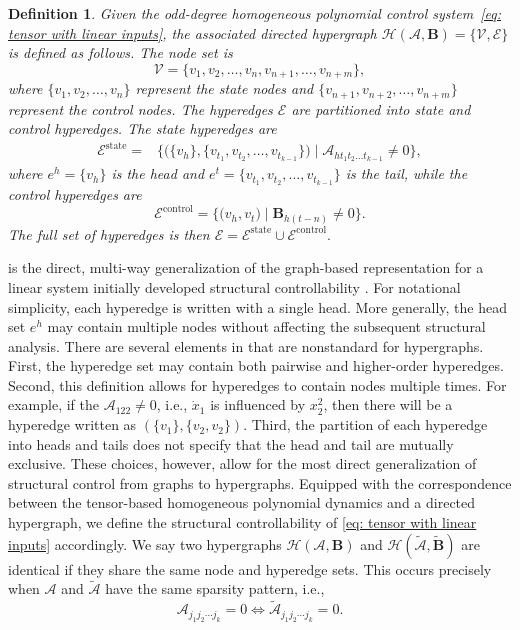 \documentclass[journal,twoside,web]{ieeecolor}
\newtheorem{definition}{Definition}
\begin{document}
\begin{definition}\label{def: HG of tA Bv}
Given the odd-degree homogeneous polynomial control system~\eqref{eq: tensor with linear inputs}, 
the associated directed hypergraph 
$\mathcal{H}(\mathscr{A},\mathbf{B}) = \{\mathcal{V}, \mathcal{E}\}$ 
is defined as follows. The node set is
\[
\mathcal{V} = \{v_1, v_2, \dots, v_n, v_{n+1}, \dots, v_{n+m}\},
\]
where $\{v_1, v_2, \dots, v_n\}$ represent the state nodes and 
$\{v_{n+1}, v_{n+2}, \dots, v_{n+m}\}$ represent the control nodes.   The hyperedges $\mathcal{E}$ are partitioned into state and control hyperedges. The state hyperedges are
    \begin{align*}       
        \mathcal{E}^\text{state}=&\Big\{\big(\{v_{h}\},\{v_{t_1}, v_{t_2},\dots,v_{t_{k-1}}\}\big)\;\big|\;\mathscr{A}_{h{t_1}{t_2}\dots {t_{k-1}}}\neq 0\Big\},
    \end{align*}
    where $e^h=\{v_{h}\}$ is the head and $e^t=\{v_{t_1},v_{t_2},\dots,v_{t_{k-1}}\}$ is the tail,
    while the control hyperedges are
    \begin{equation*}
        \mathcal{E}^{\text{control}}
        =
        \Big\{
        \big(
        v_{h},
        v_t\big)
        \;|\;
        \mathbf{B}_{h(t-n)} \neq 0
        \Big\}.
    \end{equation*}
    The full set of hyperedges is then $\mathcal{E}=\mathcal{E}^\text{state}\cup\mathcal{E}^\text{control}.$
\end{definition}


 is the direct, multi-way generalization of the graph-based representation for a linear system initially developed structural controllability \cite[Section II]{lin1974structural}. For notational simplicity, each hyperedge is written with a single head. More generally, the head set $e^h$ may contain multiple nodes without affecting the subsequent structural analysis.
%
There are several elements in  that are nonstandard for hypergraphs.
%
First, the hyperedge set may contain both pairwise and higher-order hyperedges.
%
Second, this definition allows for hyperedges to contain nodes multiple times.
%
For example, if the $\mathscr{A}_{122}\neq0$, i.e., $\dot{{x}}_1$ is influenced by ${x}_2^2$, then there will be a hyperedge written as $(\{v_1\},\{v_2,v_2\}).$
%
Third, the partition of each hyperedge into heads and tails does not specify that the head and tail are mutually exclusive.
%
These choices, however, allow for the most direct generalization of structural control from graphs to hypergraphs.
%
Equipped with the correspondence between the tensor-based homogeneous polynomial dynamics and a directed hypergraph, we define the structural controllability of \eqref{eq: tensor with linear inputs} accordingly.
%
We say two hypergraphs $\mathcal{H}(\mathscr{A},\textbf{B})$ and $\mathcal{H}(\tilde{\mathscr{A}},\tilde{\textbf{B}})$ are identical if they share the same node and hyperedge sets.
%
This occurs precisely when $\mathscr{A}$ and $\tilde{\mathscr{A}}$ have the same sparsity pattern, i.e.,
\[
\mathscr{A}_{j_1 j_2 \cdots j_k} = 0 \Longleftrightarrow \tilde{\mathscr{A}}_{j_1 j_2 \cdots j_k} = 0.
\]
\end{document}
